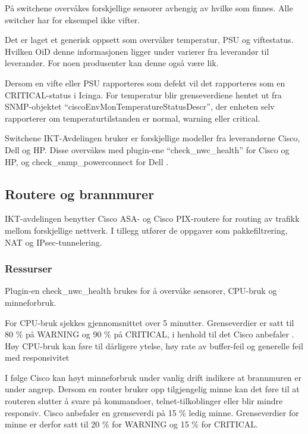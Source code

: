 På switchene overvåkes forskjellige sensorer avhengig av hvilke som finnes. Alle switcher har for eksempel ikke vifter.

Det er laget et generisk oppsett som overvåker temperatur, PSU og viftestatus. Hvilken OiD denne informasjonen ligger under varierer fra leverandør til leverandør. For noen produsenter kan denne også være lik. 

Dersom en vifte eller PSU rapporteres som defekt vil det rapporteres som en CRITICAL-status i Icinga. For temperatur blir grenseverdiene hentet ut fra SNMP-objektet ``ciscoEnvMonTemperatureStatusDescr'', der enheten selv rapporterer om temperaturtilstanden er normal, warning eller critical\cite{cisco_env_mib}.

Switchene IKT-Avdelingen bruker er forskjellige modeller fra leverandørne Cisco, Dell og HP. Disse overvåkes med plugin-ene ``check\_nwc\_health'' \cite{checknwc} for Cisco og HP, og check\_snmp\_powerconnect for Dell \cite{checkpowerconnect}.

\subsection{Routere og brannmurer}
IKT-avdelingen benytter Cisco ASA- og Cisco PIX-routere for routing av trafikk mellom forskjellige nettverk. I tillegg utfører de oppgaver som pakkefiltrering, NAT og IPsec-tunnelering.

\subsubsection{Ressurser}
Plugin-en check\_nwc\_health brukes for å overvåke sensorer, CPU-bruk og minneforbruk.

For CPU-bruk sjekkes gjennomsnittet over 5 minutter. Grenseverdier er satt til 80 \% på WARNING og 90 \% på CRITICAL, i henhold til det Cisco anbefaler \cite{ciscounifiedcommunication}. Høy CPU-bruk kan føre til dårligere ytelse, høy rate av buffer-feil og generelle feil med responsivitet \cite{ciscocpurouters}

I følge Cisco kan høyt minneforbruk under vanlig drift indikere at brannmuren er under angrep\cite{ciscomem}. Dersom en router bruker opp tilgjengelig minne kan det føre til at routeren slutter å svare på kommandoer, telnet-tilkoblinger eller blir mindre responsiv\cite{ciscomemproblem}. Cisco anbefaler en grenseverdi på 15 \% ledig minne\cite{ciscounifiedcommunication}. Grenseverdier for minne er derfor satt til 20 \% for WARNING og 15 \% for CRITICAL.

